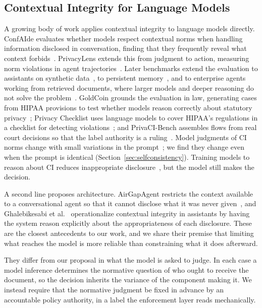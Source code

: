 \subsection{Contextual Integrity for Language Models}
A growing body of work applies contextual integrity to language models
directly. ConfAIde evaluates whether models respect contextual norms when
handling information disclosed in conversation, finding that they frequently
reveal what context forbids~\cite{mireshghallah2024}. PrivacyLens extends this
from judgment to action, measuring norm violations in agent
trajectories~\cite{shao2024}. Later benchmarks extend the evaluation to
assistants on synthetic data~\cite{cheng2024cibench}, to persistent
memory~\cite{mireshghallah2026cimemories}, and to enterprise agents working from
retrieved documents, where larger models and deeper reasoning do not solve the
problem~\cite{fu2026ciwork}. GoldCoin grounds the evaluation in law,
generating cases from HIPAA provisions to test whether models reason correctly
about statutory privacy~\cite{goldcoin}; Privacy Checklist uses language models
to cover HIPAA's regulations in a checklist for detecting
violations~\cite{li2025checklist}; and PrivaCI-Bench assembles flows from real
court decisions so that the label authority is a ruling~\cite{privacibench}.
Model judgments of CI norms change with small variations in the
prompt~\cite{shvartzshnaider2024llmci}; we find they change even when the
prompt is identical (Section~\ref{sec:selfconsistency}). Training models to
reason about CI reduces inappropriate disclosure~\cite{lan2025}, but the model
still makes the decision.

A second line proposes architecture. AirGapAgent restricts the context
available to a conversational agent so that it cannot disclose what it was
never given~\cite{bagdasarian2024}, and Ghalebikesabi et
al.~\cite{ghalebikesabi2024} operationalize contextual integrity in assistants
by having the system reason explicitly about the appropriateness of each
disclosure. These are the closest antecedents to our work, and we share their
premise that limiting what reaches the model is more reliable than constraining
what it does afterward.

They differ from our proposal in what the model is asked to judge. In each case
a model inference determines the normative question of who ought to receive the
document, so the decision inherits the variance of the component making it. We
instead require that the normative judgment be fixed in advance by an
accountable policy authority, in a label the enforcement layer reads
mechanically.


